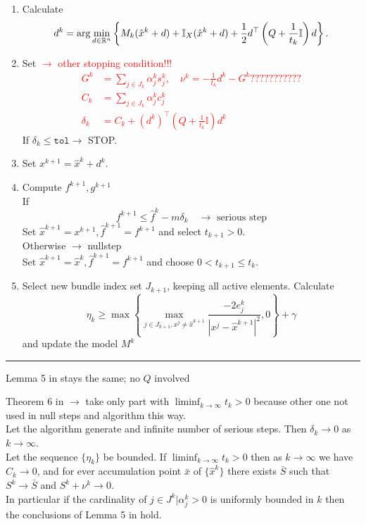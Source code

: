\begin{enumerate}
	\item Calculate \[d^k = \arg \min_{d \in \mathbb{R}^n} \left\{ M_k(\hat{x}^k+d)+\mathbb{I}_X(\hat{x}^k+d)+\frac{1}{2}d^{\top}\left(Q+\frac{1}{t_k}\mathbb{I}\right)d\right\}.\]
	\item Set \textcolor{red}{\(\to\) other stopping condition!!!
		\begin{align*} 
		  G^k &= \sum_{j \in J_k}{\alpha_j^k s_j^k}, \quad	\nu^k = -\frac{1}{t_k}d^k-G^k???????????\\
			C_k &= \sum_{j \in J_k}{\alpha_j^k c_j^k} \\
	    \delta_k &=  C_k + (d^k)^{\top}\left(Q+\frac{1}{t_k}\mathbb{I}\right)d^k
		\end{align*} }
		If \(\delta_k \leq \mathtt{tol} \rightarrow \) STOP.
	\item Set \( x^{k+1} = \hat{x}^k + d^k \).
	\item Compute \(f^{k+1}, g^{k+1}\) \\
	If 
	\[f^{k+1} \leq \hat{f}^k - m\delta_k \quad \rightarrow \text{ serious step} \]
	Set \(\hat{x}^{k+1} = x^{k+1}, \hat{f}^{k+1} = f^{k+1}\) and select \(t_{k+1} > 0\). \\
	Otherwise \(\rightarrow\) nullstep \\
	Set \(\hat{x}^{k+1} = \hat{x}^k, \hat{f}^{k+1}=f^{k+1}\) and choose \(0 < t_{k+1} \leq t_k\). 	
	\item Select new bundle index set \(J_{k+1}\), keeping all active elements. Calculate 
	\[ \eta_k \geq \max{\left\{\max_{j \in J_{k+1}, x^j \neq \hat{x}^{k+1}}{\frac{-2e_j^k}{|x^j - \hat{x}^{k+1}|^2}, 0}\right\}}+\gamma  \]
	and update the model \(M^k\)
\end{enumerate}
\vspace{1ex}
\hrule

\vspace{1.5em}

Lemma 5 in \cite{Hare2016} stays the same; no \(Q\) involved \\

\begin{theorem}
	Theorem 6 in \cite{Hare2016} \(\to\) take only part with \(\liminf_{k\to\infty}t_k > 0 \) because other one not used in null steps and algorithm this way. \\
	Let the algorithm generate and infinite number of serious steps. Then \(\delta_k \to 0\) as \(k \to \infty\). \\
	Let the sequence \(\{\eta_k\}\) be bounded. If \(\liminf_{k \to \infty} t_k > 0\) then as \(k \to \infty\) we have \(C_k \to 0\), and for ever accumulation point \(\bar{x}\) of \(\{\hat{x}^k\}\) there exists \(\bar{S}\) such that \(S^k \to \bar{S}\) and \(S^k + \nu^k \to 0\). \\
	In particular if the cardinality of \({j \in J^k|\alpha_j^k > 0}\) is uniformly bounded in \(k\) then the conclusions of Lemma 5 in \cite{Hare2016} hold.
\end{theorem}

